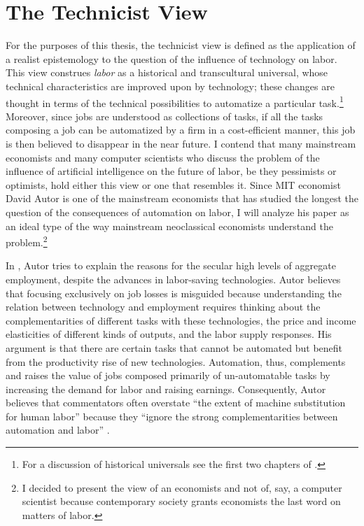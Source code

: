 \documentclass[version=last,draft=false,paper=A4,portrait,twoside=true,twocolumn=false,headinclude=false,footinclude=false,fontsize=12,BCOR=20mm,DIV=calc,pagesize=auto,titlepage=firstiscover,mpinclude=false,open=right,chapterprefix=true,numbers=autoendperiod,headsepline=false,headings=twolinechapter,parskip=false]{scrbook}
\begin{document}
\section{The Technicist View}
\label{sec:org0ded153}
For the purposes of this thesis, the technicist view is defined as the
application of a realist epistemology to the question of the influence of
technology on labor. This view construes \emph{labor} as a historical and
transcultural universal, whose technical characteristics are improved upon
by technology; these changes are thought in terms of the technical
possibilities to automatize a particular task.\footnote{For a discussion of historical universals see the first two chapters
of \textcite{foucault2004}.} Moreover, since jobs
are understood as collections of tasks, if all the tasks composing a job
can be automatized by a firm in a cost-efficient manner, this job is then
believed to disappear in the near future. I contend that many mainstream
economists and many computer scientists who discuss the problem of the
influence of artificial intelligence on the future of labor, be they
pessimists or optimists, hold either this view or one that resembles it.
Since MIT economist David Autor is one of the mainstream economists that
has studied the longest the question of the consequences of automation on
labor, I will analyze his paper  as an ideal type of the
way mainstream neoclassical economists understand the problem.\footnote{I decided to present the view of an economists and not of, say, a
computer scientist because contemporary society grants economists the last
word on matters of labor.}


In , Autor tries to explain the reasons for the secular
high levels of aggregate employment, despite the advances in labor-saving
technologies. Autor believes that focusing exclusively on job losses is
misguided because understanding the relation between technology and
employment requires thinking about the complementarities of different tasks
with these technologies, the price and income elasticities of different
kinds of outputs, and the labor supply responses. His argument is that
there are certain tasks that cannot be automated but benefit from the
productivity rise of new technologies. Automation, thus, complements and
raises the value of jobs composed primarily of un-automatable tasks by
increasing the demand for labor and raising earnings. Consequently, Autor
believes that commentators often overstate ``the extent of machine
substitution for human labor'' because they ``ignore the strong
complementarities between automation and labor'' \autocite[5]{autor2015}.
\end{document}

